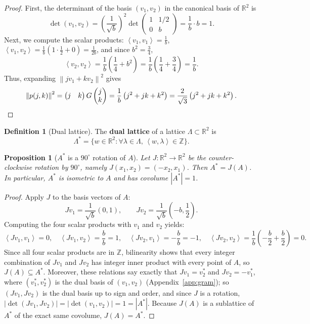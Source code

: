 \documentclass[11pt, a4paper]{article}
\newtheorem{proposition}[theorem]{Proposition}
\theoremstyle{definition}
\newtheorem{definition}[theorem]{Definition}
\theoremstyle{remark}
\newcommand{\R}{\mathbb{R}}
\newcommand{\Z}{\mathbb{Z}}
\newcommand{\norm}[1]{\left\lVert #1 \right\rVert}
\newcommand{\abs}[1]{\left\lvert #1 \right\rvert}
\newcommand{\inner}[2]{\left\langle #1, #2 \right\rangle}
\begin{document}
\begin{proof}
First, the determinant of the basis $(v_1, v_2)$ in the canonical basis of $\R^2$ is
\[
\det(v_1, v_2) = \left(\frac{1}{\sqrt{b}}\right)^2 \det \begin{pmatrix} 1 & 1/2 \\ 0 & b \end{pmatrix} = \frac{1}{b} \cdot b = 1.
\]
Next, we compute the scalar products: $\inner{v_1}{v_1} = \frac{1}{b}$, $\inner{v_1}{v_2} = \frac{1}{b}\left(1 \cdot \frac{1}{2} + 0\right) = \frac{1}{2b}$, and since $b^2 = \frac{3}{4}$,
\[
\inner{v_2}{v_2} = \frac{1}{b}\left(\frac{1}{4} + b^2\right) = \frac{1}{b}\left(\frac{1}{4} + \frac{3}{4}\right) = \frac{1}{b}.
\]
Thus, expanding $\norm{j v_1 + k v_2}^2$ gives
\[
\norm{p(j, k)}^2 = \begin{pmatrix} j & k \end{pmatrix} G \begin{pmatrix} j \\ k \end{pmatrix} = \frac{1}{b}\left(j^2 + j k + k^2\right) = \frac{2}{\sqrt{3}}\left(j^2 + j k + k^2\right). \qedhere
\]
\end{proof}

\begin{definition}[Dual lattice]
The \textbf{dual lattice} of a lattice $\Lambda \subset \R^2$ is
\[
\Lambda^* = \{w \in \R^2 : \forall \lambda \in \Lambda, \, \inner{w}{\lambda} \in \Z\}.
\]
\end{definition}

\begin{proposition}[$A^*$ is a $90^\circ$ rotation of $A$]
\label{prop:dual_A}
Let $J : \R^2 \to \R^2$ be the counter-clockwise rotation by $90^\circ$, namely $J(x_1, x_2) = (-x_2, x_1)$. Then $A^* = J(A)$. In particular, $A^*$ is isometric to $A$ and has covolume $\abs{A^*} = 1$.
\end{proposition}

\begin{proof}
Apply $J$ to the basis vectors of $A$:
\[
J v_1 = \frac{1}{\sqrt{b}}(0, 1), \qquad J v_2 = \frac{1}{\sqrt{b}}\left(-b, \frac{1}{2}\right).
\]
Computing the four scalar products with $v_1$ and $v_2$ yields:
\[
\inner{J v_1}{v_1} = 0, \quad \inner{J v_1}{v_2} = \frac{b}{b} = 1, \quad \inner{J v_2}{v_1} = -\frac{b}{b} = -1, \quad \inner{J v_2}{v_2} = \frac{1}{b}\left(-\frac{b}{2} + \frac{b}{2}\right) = 0.
\]
Since all four scalar products are in $\Z$, bilinearity shows that every integer combination of $J v_1$ and $J v_2$ has integer inner product with every point of $A$, so $J(A) \subseteq A^*$. Moreover, these relations say exactly that $J v_1 = v_2^*$ and $J v_2 = -v_1^*$, where $(v_1^*, v_2^*)$ is the dual basis of $(v_1, v_2)$ (Appendix~\ref{app:gram}); so $(J v_1, J v_2)$ is the dual basis up to sign and order, and since $J$ is a rotation, $\abs{\det(J v_1, J v_2)} = \abs{\det(v_1, v_2)} = 1 = \abs{A^*}$. Because $J(A)$ is a sublattice of $A^*$ of the exact same covolume, $J(A) = A^*$.
\end{proof}
\end{document}
